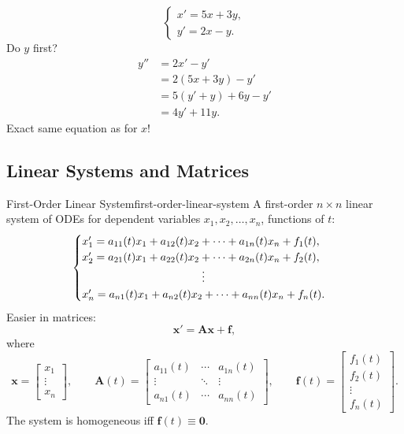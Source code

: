 \begin{example}
  \[
    \begin{cases}
      x'=5x+3y, \\
      y'=2x-y.
    \end{cases}
  \]
  Do $y$ first?
  \begin{align*}
    y'' & =2x'-y'        \\
        & =2(5x+3y)-y'   \\
        & =5(y'+y)+6y-y' \\
        & =4y'+11y.
  \end{align*}
  Exact same equation as for $x$!
\end{example}

\subsection{Linear Systems and Matrices}

\begin{definition}{First-Order Linear System}{first-order-linear-system}
  A first-order $n\times n$ linear system of ODEs for dependent variables
  $x_1,x_2,\ldots,x_n$, functions of $t$:
  \[
    \begin{cases}
      x_1'=a_{11}(t)x_1+a_{12}(t)x_2+\cdots+a_{1n}(t)x_n+f_1(t), \\
      x_2'=a_{21}(t)x_1+a_{22}(t)x_2+\cdots+a_{2n}(t)x_n+f_2(t), \\
      \hfill\vdots\hfill                                         \\
      x_n'=a_{n1}(t)x_1+a_{n2}(t)x_2+\cdots+a_{nn}(t)x_n+f_n(t).
    \end{cases}
  \]
  Easier in matrices:
  \[
    \mathbf{x}'=\mathbf{A}\mathbf{x}+\mathbf{f},
  \]
  where
  \[
    \mathbf{x}=
    \begin{bmatrix}
      x_1 \\\vdots\\x_n
    \end{bmatrix}
    ,\qquad
    \mathbf{A}(t)=
    \begin{bmatrix}
      a_{11}(t) & \cdots & a_{1n}(t) \\
      \vdots    & \ddots & \vdots    \\
      a_{n1}(t) & \cdots & a_{nn}(t)
    \end{bmatrix}
    ,\qquad
    \mathbf{f}(t)=
    \begin{bmatrix}
      f_1(t) \\f_2(t)\\\vdots\\f_n(t)
    \end{bmatrix}
    .
  \]
  The system is homogeneous iff $\mathbf{f}(t)\equiv\mathbf{0}$.
\end{definition}

